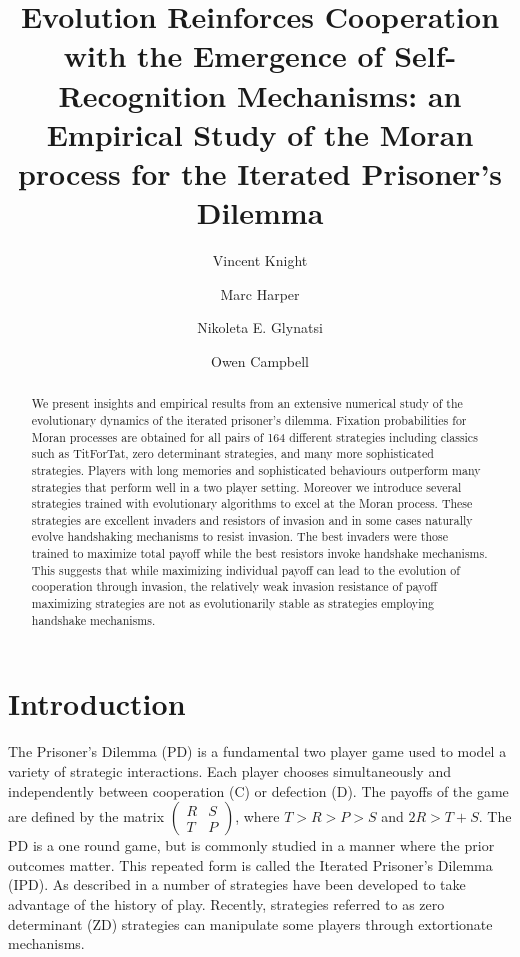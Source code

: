 \documentclass[10pt,journal]{IEEEtran}
\title{Evolution Reinforces Cooperation with the Emergence of Self-Recognition
       Mechanisms: an Empirical Study of the Moran process for the Iterated
       Prisoner's Dilemma}
\author[1]{Vincent Knight}
\author[2]{Marc Harper}
\author[1]{Nikoleta E. Glynatsi}
\author[3]{Owen Campbell}
\affil[1]{Cardiff University, School of Mathematics, UK}
\affil[2]{Google Inc., Mountain View, CA, USA}
\affil[3]{Not affiliated}
\date{}
\begin{document}
\maketitle

\begin{abstract}
    We present insights and empirical results from an extensive numerical
    study of the evolutionary dynamics of the iterated prisoner's dilemma.
    Fixation probabilities for Moran processes are obtained
    for all pairs of 164 different strategies including classics such as TitForTat, zero
    determinant strategies, and many more sophisticated strategies.
    Players with long memories and sophisticated behaviours outperform
    many strategies that perform well in a two player setting. Moreover we
    introduce several strategies trained with evolutionary algorithms to
    excel at the Moran process. These strategies are excellent invaders
    and resistors of invasion and in some cases naturally evolve handshaking
    mechanisms to resist invasion. The best invaders were those trained
    to maximize total payoff while the best resistors invoke handshake mechanisms.
    This suggests that while maximizing individual payoff
    can lead to the evolution of cooperation through invasion, the relatively
    weak invasion resistance of payoff maximizing strategies are not as
    evolutionarily stable as strategies employing handshake mechanisms.
\end{abstract}

\section{Introduction}\label{sec:introduction}

The Prisoner's Dilemma (PD) \cite{Flood1958} is a fundamental two player game
used to model a variety of strategic interactions. Each player chooses
simultaneously and independently
between cooperation (C) or defection (D). The payoffs of
the game are defined by the matrix $\begin{pmatrix} R & S \\ T & P
\end{pmatrix}$, where $T > R > P > S$ and $2R > T + S$. The PD is a one
round game, but is commonly studied in a manner where the prior outcomes
matter. This repeated form is called the Iterated Prisoner's
Dilemma (IPD). As described in \cite{Axelrod1980a, Knight2016, Press2012} a
number of strategies have been developed to take advantage of the history of
play. Recently, strategies referred to as zero determinant (ZD) strategies
\cite{Press2012} can manipulate some players through extortionate mechanisms.
\end{document}
